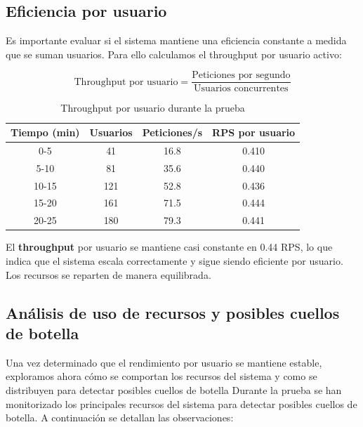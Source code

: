 \documentclass[10pt]{book}
\begin{document}
\subsection{Eficiencia por usuario}
 Es importante evaluar si el sistema mantiene una eficiencia constante a medida que se suman usuarios. 
Para ello calculamos el throughput por usuario activo:

\[
\text{Throughput por usuario} = \frac{\text{Peticiones por segundo}}{\text{Usuarios concurrentes}}
\]

\begin{table}[H]
\centering
\begin{tabular}{|c|c|c|c|}
\hline
\textbf{Tiempo (min)} & \textbf{Usuarios} & \textbf{Peticiones/s} & \textbf{RPS por usuario} \\
\hline
0-5  & 41  & 16.8  & 0.410 \\
5-10 & 81  & 35.6  & 0.440 \\
10-15 & 121 & 52.8  & 0.436 \\
15-20 & 161 & 71.5  & 0.444 \\
20-25 & 180 & 79.3  & 0.441 \\
\hline
\end{tabular}
\caption{Throughput por usuario durante la prueba}
\end{table}

El \textbf{throughput} por usuario se mantiene casi constante en 0.44 RPS, lo que indica que el sistema escala correctamente y sigue siendo eficiente por usuario. Los recursos se reparten de manera equilibrada.

\subsection{Análisis de uso de recursos y posibles cuellos de botella}
Una vez determinado que el rendimiento por usuario se mantiene estable, exploramos ahora cómo se comportan los recursos del sistema y como se distribuyen para detectar posibles cuellos de botella
Durante la prueba se han monitorizado los principales recursos del sistema para detectar posibles cuellos de botella. A continuación se detallan las observaciones:
\end{document}

